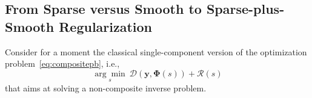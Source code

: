 \documentclass[12pt]{article}
\begin{document}


    
    \subsection{From Sparse versus Smooth to Sparse-plus-Smooth Regularization}
    \label{sec:regularizationblabla}

    Consider for a moment the classical single-component version of the optimization problem~\eqref{eq:compositepb}, i.e.,
    \begin{equation} \label{eq:singletpb}
        \underset{s}{\arg\min} \ \mathcal{D}(\bm{y}, \bm{\Phi}(s)) + \mathcal{R} (s)
    \end{equation}
    that aims at solving a non-composite inverse problem.
\end{document}
